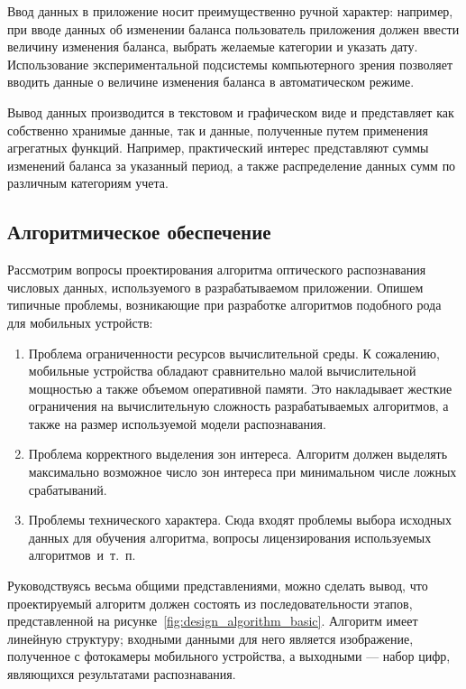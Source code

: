 Ввод данных в приложение носит преимущественно ручной характер:
например, при вводе данных об изменении баланса
пользователь приложения должен ввести величину изменения баланса,
выбрать желаемые категории и указать дату.
Использование экспериментальной подсистемы компьютерного зрения
позволяет вводить данные о величине изменения баланса в
автоматическом режиме.

Вывод данных производится в текстовом и графическом виде и
представляет как собственно хранимые данные, так и данные, полученные путем
применения агрегатных функций. Например, практический интерес представляют
суммы изменений баланса за указанный период, а также распределение
данных сумм по различным категориям учета.

\subsection{Алгоритмическое обеспечение}
\label{ssec:design_algorithm}

Рассмотрим вопросы проектирования алгоритма оптического
распознавания числовых данных, используемого в разрабатываемом приложении.
Опишем типичные проблемы, возникающие при разработке алгоритмов подобного рода
для мобильных устройств:
\begin{enumerate}
  \item Проблема ограниченности ресурсов вычислительной среды.
    К сожалению, мобильные устройства обладают сравнительно малой вычислительной
    мощностью а также объемом оперативной памяти.
    Это накладывает жесткие ограничения на вычислительную сложность
    разрабатываемых алгоритмов, а также на размер используемой модели распознавания.
  \item Проблема корректного выделения зон интереса.
    Алгоритм должен выделять максимально возможное число зон интереса
    при минимальном числе ложных срабатываний.
  \item Проблемы технического характера. Сюда входят проблемы выбора исходных данных для
    обучения алгоритма, вопросы лицензирования используемых алгоритмов~и~т.~п.
\end{enumerate}

Руководствуясь весьма общими представлениями, можно сделать вывод,
что проектируемый алгоритм должен состоять из последовательности этапов,
представленной на рисунке~\ref{fig:design_algorithm_basic}.
Алгоритм имеет линейную структуру; входными данными для него является изображение,
полученное с фотокамеры мобильного устройства, а выходными --- набор цифр,
являющихся результатами распознавания.

